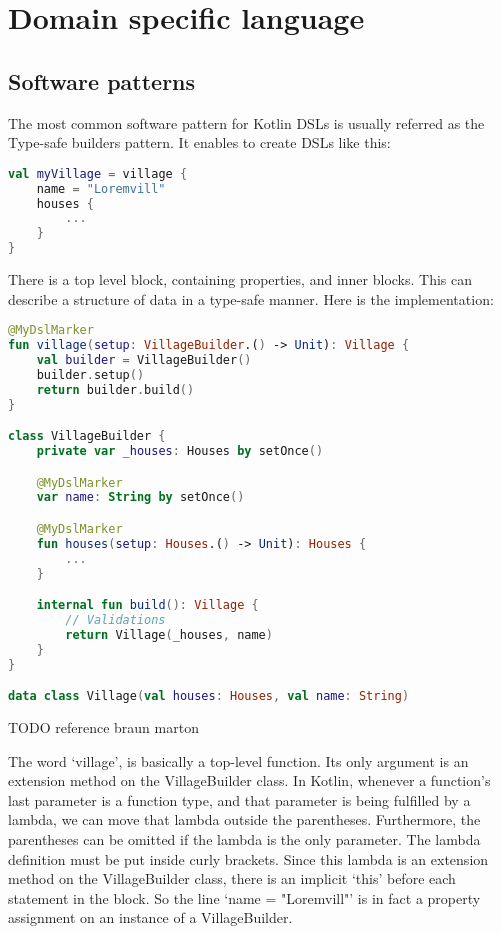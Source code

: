 \section{Domain specific language}

\subsection{Software patterns}

The most common software pattern for Kotlin DSLs is usually referred as the Type-safe builders pattern. It enables to create DSLs like this:

\begin{lstlisting}[caption={Example DSL usage},language=Kotlin,label=code:pattern_example_usage]
val myVillage = village {
    name = "Loremvill"
    houses {
        ...
    }
}
\end{lstlisting}

There is a top level block, containing properties, and inner blocks. This can describe a structure of data in a type-safe manner. Here is the implementation:

\begin{lstlisting}[caption={Pattern example},language=Kotlin,label=code:pattern_example_impl]
@MyDslMarker
fun village(setup: VillageBuilder.() -> Unit): Village {
    val builder = VillageBuilder()
    builder.setup()
    return builder.build()
}

class VillageBuilder {
    private var _houses: Houses by setOnce()

    @MyDslMarker
    var name: String by setOnce()

    @MyDslMarker
    fun houses(setup: Houses.() -> Unit): Houses {
        ...
    }

    internal fun build(): Village {
        // Validations
        return Village(_houses, name)
    }
}

data class Village(val houses: Houses, val name: String)
\end{lstlisting}

TODO reference braun marton

The word `village', is basically a top-level function. Its only argument is an extension method on the VillageBuilder class. In Kotlin, whenever a function's last parameter is a function type, and that parameter is being fulfilled by a lambda, we can move that lambda outside the parentheses. Furthermore, the parentheses can be omitted if the lambda is the only parameter. The lambda definition must be put inside curly brackets. Since this lambda is an extension method on the VillageBuilder class, there is an implicit `this' before each statement in the block. So the line `name = "Loremvill"' is in fact a property assignment on an instance of a VillageBuilder.

